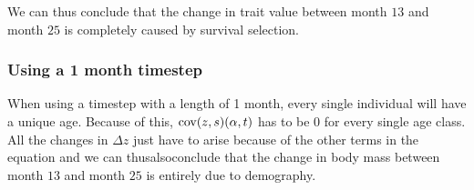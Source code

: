 We can thus conclude that the change in trait value between month $13$ and month $25$ is completely caused by survival selection.

\subsubsection{Using a 1 month timestep}
When using a timestep with a length of 1 month, every single individual will have a unique age. Because of this, $\mathrm{cov}(z,s)(\alpha,t)$ has to be $0$ for every single age class. All the changes in $\Delta z$ just have to arise because of the other terms in the equation and we can thus\textemdash also\textemdash conclude that the change in body mass between month $13$ and month $25$ is entirely due to demography.